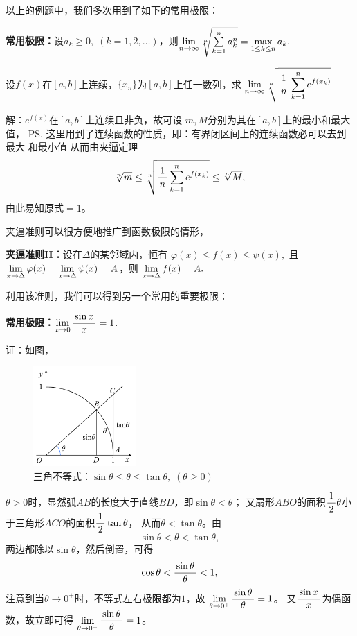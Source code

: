 以上的例题中，我们多次用到了如下的常用极限：
\begin{thx}
  {\bf 常用极限：}设$a_k\geq0,\;(k=1,2,\ldots)$，则$\lim\limits_{n\to\infty}\sqrt[n]
  {\sum\limits_{k=1}^na_k^n}=\max\limits_{1\leq k\leq n}a_k.$
\end{thx}

\bs
\egz 设$f(x)$在$[a,b]$上连续，$\{x_n\}$为$[a,b]$上任一数列，求
$\lim\limits_{n\to\infty}\sqrt[n]{\displaystyle\frac{\,{1}\,}{\,{n}\,}\sum\limits_{k=1}^ne^{f(x_k)}}$

解：$e^{f(x)}$在$[a,b]$上连续且非负，故可设
$m,M$分别为其在$[a,b]$上的最小和最大值，
\ps{这里用到了连续函数的性质，即：有界闭区间上的连续函数必可以去到最大
和最小值}
从而由夹逼定理
$$\sqrt[n]m\leq\sqrt[n]{\displaystyle\frac{\,{1}\,}{\,{n}\,}\sum\limits_{k=1}^ne^{f(x_k)}}\leq\sqrt[n]M,$$
由此易知原式$=1$。\fin

\bs
夹逼准则可以很方便地推广到函数极限的情形，
\begin{thx}
	{\bf 夹逼准则II：}设在$\Delta$的某邻域内，恒有
	$\varphi(x)\leq f(x)\leq\psi(x), $
	且$\lim\limits_{x\to{\Delta}}\varphi(x)=\lim\limits_{x\to{\Delta}}\psi(x)=A$，则
	$\lim\limits_{x\to{\Delta}}f(x)=A.$
\end{thx}

利用该准则，我们可以得到另一个常用的重要极限：
\begin{thx}
	{\bf 常用极限：}$\lim\limits_{x\to{0}}\displaystyle\frac{\,{\sin x}\,}{\,{x}\,}=1$.
\end{thx}

证：如图，
	
\begin{figure}[h]
	\centering
	\includegraphics[width=0.35\textwidth]{./Images/Ch01/xsintan.pdf}
	\caption{三角不等式：$\sin\theta\leq\theta\leq\tan\theta,
	\;(\theta\geq0)$}
	\label{fig:xsintan}
\end{figure}
$\theta>0$时，显然弧$AB$的长度大于直线$BD$，即$\sin\theta<\theta$；
又扇形$ABO$的面积$\displaystyle\frac{\,{1}\,}{\,{2}\,}\theta$小于三角形$ACO$的面积$\displaystyle\frac{\,{1}\,}{\,{2}\,}\tan\theta$，
从而$\theta<\tan\theta$。由
$$\sin\theta<\theta<\tan\theta,$$
两边都除以$\sin\theta$，然后倒置，可得
$$\cos\theta<\displaystyle\frac{\,{\sin\theta}\,}{\,{\theta}\,}<1,$$
注意到当$\theta\to 0^+$时，不等式左右极限都为$1$，故
$\lim\limits_{\theta\to0^+}\displaystyle\frac{\,{\sin\theta}\,}{\,{\theta}\,}=1$。
又$\displaystyle\frac{\,{\sin x}\,}{\,{x}\,}$为偶函数，故立即可得
$\lim\limits_{\theta\to0^-}\displaystyle\frac{\,{\sin\theta}\,}{\,{\theta}\,}=1$。

